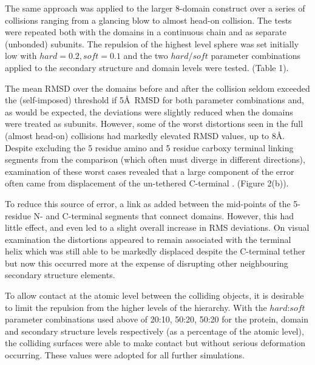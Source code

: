 \documentclass[review]{elsarticle}
\begin{document}
{{{{{The same approach was applied to the larger 8-domain construct over a series of collisions 
ranging from a glancing blow to almost head-on collision.  The tests were repeated
both with the domains in a continuous chain and as separate (unbonded) subunits.
The repulsion of the highest level sphere was set initially low with $hard=0.2, soft=0.1$
and the two $hard$/$soft$ parameter combinations applied to the secondary structure and domain 
levels were tested.  (Table 1).

The mean RMSD over the domains before and after the collision seldom exceeded the (self-imposed)
threshold if 5\AA\ RMSD for both parameter combinations and, as would be expected, the deviations
were slightly reduced when the domains were treated as subunits.   However, some of the worst
distortions seen in the full (almost head-on) collisions had markedly elevated RMSD values, up to 8\AA.
Despite excluding the 5 residue amino and 5 residue carboxy terminal linking segments from the comparison
(which often must diverge in different directions), examination of these worst cases revealed that a
large component of the error often came from displacement of the un-tethered C-terminal \AH.
(Figure 2(b)).

To reduce this source of error, a link as added between the mid-points of the 5-residue N- and C-terminal
segments that connect domains.  However, this had little effect, and even led to a slight overall increase in RMS
deviations.   On visual examination the distortions appeared to remain associated with the terminal helix
which was still able to be markedly displaced despite the C-terminal tether but now this occurred more
at the expense of disrupting other neighbouring secondary structure elements.

To allow contact at the atomic level between the colliding objects,
it is desirable to limit the repulsion from the higher levels of the hierarchy.
With the $hard$:$soft$ parameter combinations used above of 20:10, 50:20, 50:20 for the protein, domain 
and secondary structure levels respectively (as a percentage of the atomic level), the colliding surfaces
were able to make contact but without serious deformation occurring.   These values were adopted for
all further simulations.

}}}}}
\end{document}
